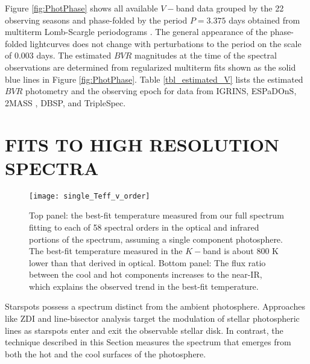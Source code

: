 \documentclass[twocolumn]{emulateapj}%
\begin{document}
Figure \ref{fig:PhotPhase} shows all available $V-$band data grouped by the 22 observing seasons and phase-folded by the period $P=3.375$ days obtained from multiterm Lomb-Scargle periodograms \citep{ivezic14}.  The general appearance of the phase-folded lightcurves does not change with perturbations to the period on the scale of 0.003 days.  The estimated $BVR$ magnitudes at the time of the spectral observations are determined from regularized multiterm fits \citep[\emph{i.e.} Fourier series truncated to the first $\sim 4$ components]{vanderplas15a} shown as the solid blue lines in Figure \ref{fig:PhotPhase}.  Table \ref{tbl_estimated_V} lists the estimated $BVR$ photometry and the observing epoch for data from IGRINS, ESPaDOnS, 2MASS \citep{skrutskie06}, DBSP, and TripleSpec.  





\section{FITS TO HIGH RESOLUTION SPECTRA}\label{sec:Starfish}

\begin{figure}
 \centering
 \texttt{[image: single\_Teff\_v\_order]}
 \caption{Top panel:  the best-fit temperature measured from our full spectrum fitting to each of 58 spectral orders in the optical and infrared portions of the spectrum,  assuming a single component photosphere.  The best-fit temperature measured in the $K-$band is about 800 K lower than that derived in optical.  Bottom panel:  The flux ratio between the cool and hot components increases to the near-IR, which explains the observed trend in the best-fit temperature.}
 \label{fig:SingleTeffvsOrder}
\end{figure}

Starspots possess a spectrum distinct from the ambient photosphere.  Approaches like ZDI and line-bisector analysis \citep[\emph{e.g.}][]{prato08, donati14} target the modulation of stellar photospheric lines as starspots enter and exit the observable stellar disk.  In contrast, the technique described in this Section measures the spectrum that emerges from both the hot and the cool surfaces of the photosphere.
\end{document}
